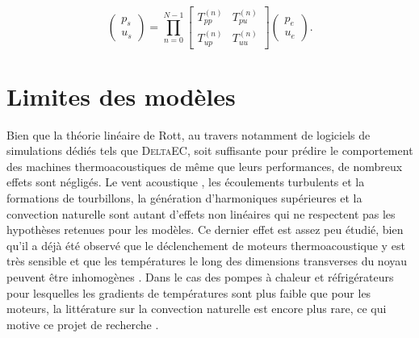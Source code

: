 \begin{equation}
\begin{pmatrix}
p_s\\
u_s
\end{pmatrix} = \prod_{n=0}^{N-1} \begin{bmatrix}
T_{pp}^{(n)} & T_{pu}^{(n)}\\
T_{up}^{(n)} & T_{uu}^{(n)}
\end{bmatrix}\begin{pmatrix}
p_e\\
u_e
\end{pmatrix}.
\label{eq:TMatrix_prod_TppTuu}
\end{equation}

\section{Limites des modèles}


Bien que la théorie linéaire de Rott, au travers notamment de logiciels de simulations dédiés tels que \textsc{DeltaEC}, soit suffisante pour prédire le comportement des machines thermoacoustiques de même que leurs performances, de nombreux effets sont négligés. Le vent acoustique \cite{so_internal_2006, bailliet_acoustic_2001, ramadan_experimental_2018}, les écoulements turbulents et la formations de tourbillons, la génération d'harmoniques supérieures et la convection naturelle sont autant d'effets non linéaires qui ne respectent pas les hypothèses retenues pour les modèles. Ce dernier effet est assez peu étudié, bien qu'il a déjà été observé que le déclenchement de moteurs thermoacoustique y est très sensible et que les températures le long des dimensions transverses du noyau peuvent être inhomogènes \cite{ross_influence_2003, ramadan_experimental_2018, hireche_numerical_2019}. Dans le cas des pompes à chaleur et réfrigérateurs pour lesquelles les gradients de températures sont plus faible que pour les moteurs, la littérature sur la convection naturelle est encore plus rare, ce qui motive ce projet de recherche \cite{zhang_novel_2011, babaei_investigation_2010}.


